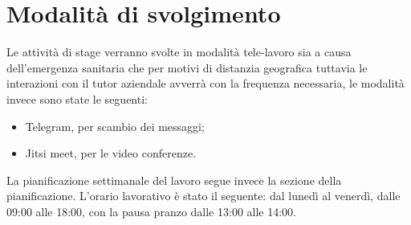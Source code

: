\section{Modalità di svolgimento}\label{sec:modalita-di-svolgimento}
Le attività di stage verranno svolte in modalità tele-lavoro sia a causa dell'emergenza sanitaria che per motivi di distanzia geografica tuttavia le interazioni con il tutor aziendale avverrà con la frequenza necessaria, le modalità invece sono state le seguenti:
\begin{itemize}
    \item Telegram, per scambio dei messaggi;
    \item Jitsi meet, per le video conferenze.
\end{itemize}
La pianificazione settimanale del lavoro segue invece la sezione della pianificazione.
L'orario lavorativo è stato il seguente: dal lunedì al venerdì, dalle 09:00 alle 18:00, con la pausa pranzo dalle 13:00 alle 14:00.